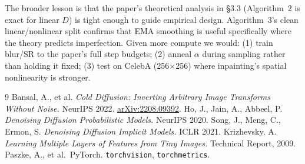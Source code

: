 \documentclass[11pt]{article}
\begin{document}
The broader lesson is that the paper's theoretical analysis in §3.3 (Algorithm~2 is exact
for linear $D$) is tight enough to guide empirical design. Algorithm~3's clean
linear/nonlinear split confirms that EMA smoothing is useful specifically where the theory
predicts imperfection. Given more compute we would: (1) train blur/SR to the paper's full
step budgets; (2) anneal $\alpha$ during sampling rather than holding it fixed; (3) test on
CelebA (256${\times}$256) where inpainting's spatial nonlinearity is stronger.

\begin{thebibliography}{9}
  Bansal, A., et al.
  \emph{Cold Diffusion: Inverting Arbitrary Image Transforms Without Noise.}
  NeurIPS 2022. \href{https://arxiv.org/abs/2208.09392}{arXiv:2208.09392}.
  Ho, J., Jain, A., Abbeel, P.
  \emph{Denoising Diffusion Probabilistic Models.}
  NeurIPS 2020.
  Song, J., Meng, C., Ermon, S.
  \emph{Denoising Diffusion Implicit Models.}
  ICLR 2021.
  Krizhevsky, A.
  \emph{Learning Multiple Layers of Features from Tiny Images.}
  Technical Report, 2009.
  Paszke, A., et al.\ PyTorch. \texttt{torchvision}, \texttt{torchmetrics}.
\end{thebibliography}
\end{document}
